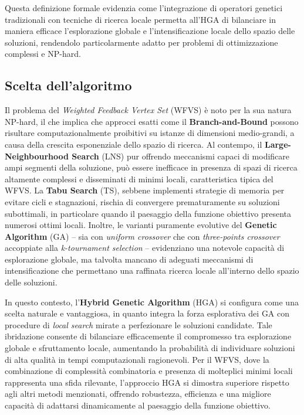 \documentclass[12pt,a4paper,twoside]{article}
\begin{document}
\bigskip
\noindent Questa definizione formale evidenzia come l'integrazione di operatori genetici tradizionali con tecniche di ricerca locale permetta all'HGA di bilanciare in maniera efficace l'esplorazione globale e l'intensificazione locale dello spazio delle soluzioni, rendendolo particolarmente adatto per problemi di ottimizzazione complessi e NP-hard.
\subsection{Scelta dell'algoritmo}
Il problema del \emph{Weighted Feedback Vertex Set} (WFVS) è noto per la sua natura NP-hard, il che implica che approcci esatti come il \textbf{Branch-and-Bound} possono risultare computazionalmente proibitivi su istanze di dimensioni medio-grandi, a causa della crescita esponenziale dello spazio di ricerca. Al contempo, il \textbf{Large-Neighbourhood Search} (LNS) pur offrendo meccanismi capaci di modificare ampi segmenti della soluzione, può essere inefficace in presenza di spazi di ricerca altamente complessi e disseminati di minimi locali, caratteristica tipica del WFVS. La \textbf{Tabu Search} (TS), sebbene implementi strategie di memoria per evitare cicli e stagnazioni, rischia di convergere prematuramente su soluzioni subottimali, in particolare quando il paesaggio della funzione obiettivo presenta numerosi ottimi locali. Inoltre, le varianti puramente evolutive del \textbf{Genetic Algorithm} (GA) – sia con \emph{uniform crossover} che con \emph{three-points crossover} accoppiate alla \emph{k-tournament selection} – evidenziano una notevole capacità di esplorazione globale, ma talvolta mancano di adeguati meccanismi di intensificazione che permettano una raffinata ricerca locale all'interno dello spazio delle soluzioni.

\noindent In questo contesto, l'\textbf{Hybrid Genetic Algorithm} (HGA) si configura come una scelta naturale e vantaggiosa, in quanto integra la forza esplorativa dei GA con procedure di \emph{local search} mirate a perfezionare le soluzioni candidate. Tale ibridazione consente di bilanciare efficacemente il compromesso tra esplorazione globale e sfruttamento locale, aumentando la probabilità di individuare soluzioni di alta qualità in tempi computazionali ragionevoli. Per il WFVS, dove la combinazione di complessità combinatoria e presenza di molteplici minimi locali rappresenta una sfida rilevante, l'approccio HGA si dimostra superiore rispetto agli altri metodi menzionati, offrendo robustezza, efficienza e una migliore capacità di adattarsi dinamicamente al paesaggio della funzione obiettivo.
\end{document}
